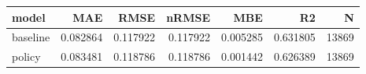 \begin{tabular}{lrrrrrr}
\toprule
model & MAE & RMSE & nRMSE & MBE & R2 & N \\
\midrule
baseline & 0.082864 & 0.117922 & 0.117922 & 0.005285 & 0.631805 & 13869 \\
policy & 0.083481 & 0.118786 & 0.118786 & 0.001442 & 0.626389 & 13869 \\
\bottomrule
\end{tabular}
